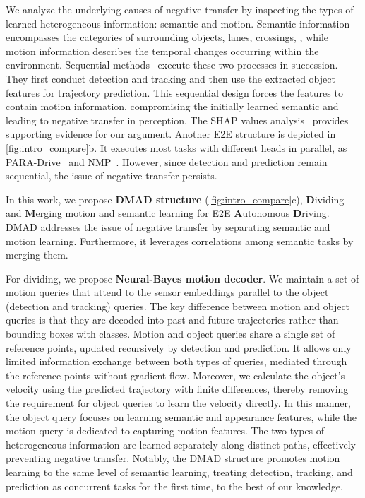 We analyze the underlying causes of negative transfer by inspecting the types of learned heterogeneous information: semantic and motion. Semantic information encompasses the categories of surrounding objects, lanes, crossings, \etc, while motion information describes the temporal changes occurring within the environment. Sequential methods~\cite{hu2023planning, jiang2023vad, zheng2025genad, doll2024dualad} execute these two processes in succession.
They first conduct detection and tracking and then use the extracted object features for trajectory prediction. This sequential design forces the features to contain motion information, compromising the initially learned semantic and leading to negative transfer in perception. The SHAP values analysis~\cite{NIPS2017_7062} provides supporting evidence for our argument.
Another \gls{E2E} structure is depicted in \cref{fig:intro_compare}b. It executes most tasks with different heads in parallel, as PARA-Drive~\cite{weng2024drive} and NMP~\cite{zeng2019end}. However, since detection and prediction remain sequential, the issue of negative transfer persists.


In this work, we propose \textbf{DMAD structure} (\cref{fig:intro_compare}c), \textbf{D}ividing and \textbf{M}erging motion and semantic learning for \gls{E2E} \textbf{A}utonomous \textbf{D}riving. DMAD addresses the issue of negative transfer by separating semantic and motion learning. Furthermore, it leverages correlations among semantic tasks by merging them.

For dividing, we propose \textbf{Neural-Bayes motion decoder}. We maintain a set of motion queries that attend to the sensor embeddings parallel to the object (detection and tracking) queries. The key difference between motion and object queries is that they are decoded into past and future trajectories rather than bounding boxes with classes. Motion and object queries share a single set of reference points, updated recursively by detection and prediction. It allows only limited information exchange between both types of queries, mediated through the reference points without gradient flow. Moreover, we calculate the object's velocity using the predicted trajectory with finite differences, thereby removing the requirement for object queries to learn the velocity directly. In this manner, the object query focuses on learning semantic and appearance features, while the motion query is dedicated to capturing motion features. The two types of heterogeneous information are learned separately along distinct paths, effectively preventing negative transfer. Notably, the DMAD structure promotes motion learning to the same level of semantic learning, treating detection, tracking, and prediction as concurrent tasks for the first time, to the best of our knowledge.

